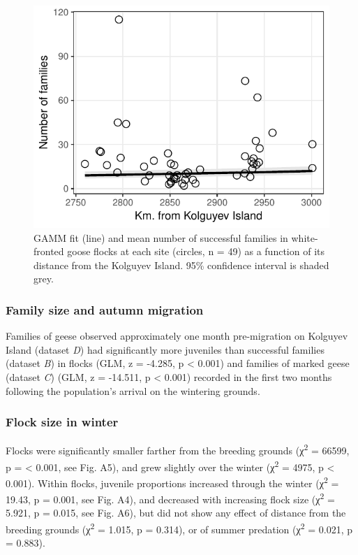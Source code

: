 \documentclass[10pt,twocolumn]{paper}
\begin{document}
\begin{figure}
\includegraphics[width = 1\linewidth]{nfams_dist.pdf}
\caption{{\small GAMM fit (line) and mean number of successful families in
white-fronted goose flocks at each site (circles, n = 49) as a function
of its distance from the Kolguyev Island. 95\% confidence interval is
shaded grey.}}
\end{figure}

\subsubsection{Family size and autumn
migration}\label{family-size-and-autumn-migration}

Families of geese observed approximately one month pre-migration on
Kolguyev Island (dataset \emph{D}) had significantly more juveniles than
successful families (dataset \emph{B}) in flocks (GLM, z = -4.285, p
\textless{} 0.001) and families of marked geese (dataset \emph{C}) (GLM,
z = -14.511, p \textless{} 0.001) recorded in the first two months
following the population's arrival on the wintering grounds.

\subsubsection{Flock size in winter}\label{flock-size-in-winter}

Flocks were significantly smaller farther from the breeding grounds
(χ\textsuperscript{2} = 66599, p = \textless{} 0.001, see Fig. A5), and
grew slightly over the winter (χ\textsuperscript{2} = 4975, p
\textless{} 0.001). Within flocks, juvenile proportions increased
through the winter (χ\textsuperscript{2} = 19.43, p = 0.001, see Fig.
A4), and decreased with increasing flock size (χ\textsuperscript{2} =
5.921, p = 0.015, see Fig. A6), but did not show any effect of distance
from the breeding grounds (χ\textsuperscript{2} = 1.015, p = 0.314), or
of summer predation (χ\textsuperscript{2} = 0.021, p = 0.883).
\end{document}
